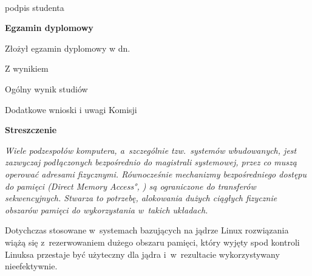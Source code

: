 \begin{titlepage}
    \par
    \vspace{2\baselineskip}
    \hfill\parbox{15em}{{\small\dotfill}\\[-.3ex]
    \centerline{\footnotesize podpis studenta}}\par
    \vspace{3\baselineskip}
    \begin{center}
        {\large\bfseries Egzamin dyplomowy} \par\bigskip\bigskip
    \end{center}
    \par\noindent\vspace{1.5\baselineskip}
    Złożył egzamin dyplomowy w dn. \dotfill
    \par\noindent\vspace{1.5\baselineskip}
    Z wynikiem \dotfill
    \par\noindent\vspace{1.5\baselineskip}
    Ogólny wynik studiów \dotfill
    \par\noindent\vspace{1.5\baselineskip}
    Dodatkowe wnioski i uwagi Komisji \dotfill
    \par\noindent\vspace{1.5\baselineskip}
    \dotfill

    \newpage\thispagestyle{empty}
    \vspace*{2\baselineskip}
    \begin{center}
        {\large\bfseries Streszczenie}\par\bigskip
    \end{center}

    {\itshape Wiele podzespołów komputera, a~szczególnie
      tzw.\ systemów wbudowanych, jest zazwyczaj podłączonych
      bezpośrednio do magistrali systemowej, przez co muszą operować
      adresami fizycznymi.  Równocześnie mechanizmy bezpośredniego
      dostępu do pamięci (\ang{Direct Memory Access}, ) są
      ograniczone do transferów sekwencyjnych.  Stwarza to potrzebę,
      alokowania dużych ciągłych fizycznie obszarów pamięci do
      wykorzystania w~takich układach.

      Dotychczas stosowane w~systemach bazujących na jądrze Linux
      rozwiązania wiążą się z~rezerwowaniem dużego obszaru pamięci,
      który wyjęty spod kontroli Linuksa przestaje być użyteczny dla
      jądra i~w~rezultacie wykorzystywany nieefektywnie.

}
\end{titlepage}
